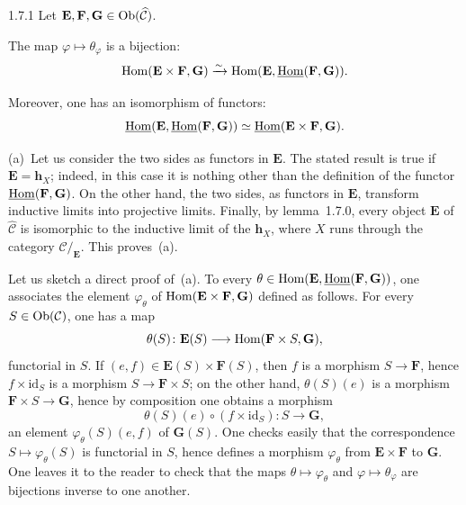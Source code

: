 \begin{proposition}{1.7.1}
\label{I.1.7.1}
\ndemark
Let \(\mathbf{E},\mathbf{F},\mathbf{G}\in\operatorname{Ob}(\widehat{\mathcal{C}})\).
\begin{enumeratea}
\item The map \(\varphi\mapsto\theta_{\varphi}\) is a bijection:
\[
\operatorname{Hom}(\mathbf{E}\times\mathbf{F},\mathbf{G})\xrightarrow{\sim}\operatorname{Hom}(\mathbf{E},\underline{\operatorname{Hom}}(\mathbf{F},\mathbf{G})).
\]
\item Moreover, one has an isomorphism of functors:
\[
\underline{\operatorname{Hom}}(\mathbf{E},\underline{\operatorname{Hom}}(\mathbf{F},\mathbf{G}))\simeq\underline{\operatorname{Hom}}(\mathbf{E}\times\mathbf{F},\mathbf{G}).
\]
\end{enumeratea}
\end{proposition}

(a)~Let us consider the two sides as functors in \(\mathbf{E}\). The stated result is true if \(\mathbf{E}=\mathbf{h}_X\); indeed, in this case it is nothing other than the definition of the functor \(\underline{\operatorname{Hom}}(\mathbf{F},\mathbf{G})\). On the other hand, the two sides, as functors in \(\mathbf{E}\), transform inductive limits into projective limits. Finally, by lemma~1.7.0, every object \(\mathbf{E}\) of \(\widehat{\mathcal{C}}\) is isomorphic to the inductive limit of the \(\mathbf{h}_X\), where \(X\) runs through the category \(\mathcal{C}/_{\mathbf{E}}\). This proves~(a).

Let us sketch a direct proof of~(a). To every \(\theta\in\operatorname{Hom}(\mathbf{E},\underline{\operatorname{Hom}}(\mathbf{F},\mathbf{G}))\), one associates the element \(\varphi_{\theta}\) of \(\operatorname{Hom}(\mathbf{E}\times\mathbf{F},\mathbf{G})\) defined as follows. For every \(S\in\operatorname{Ob}(\mathcal{C})\), one has a map
\[
\theta(S)\colon\mathbf{E}(S)\longrightarrow\operatorname{Hom}(\mathbf{F}\times S,\mathbf{G}),
\]
functorial in \(S\). If \((e,f)\in\mathbf{E}(S)\times\mathbf{F}(S)\), then \(f\) is a morphism \(S\to\mathbf{F}\), hence \(f\times\mathrm{id}_S\) is a morphism \(S\to\mathbf{F}\times S\); on the other hand, \(\theta(S)(e)\) is a morphism \(\mathbf{F}\times S\to\mathbf{G}\), hence by composition one obtains a morphism
\[
\theta(S)(e)\circ(f\times\mathrm{id}_S)\colon S\longrightarrow\mathbf{G},
\]
\ie an element \(\varphi_{\theta}(S)(e,f)\) of \(\mathbf{G}(S)\). One checks easily that the correspondence \(S\mapsto\varphi_{\theta}(S)\) is functorial in \(S\), hence defines a morphism \(\varphi_{\theta}\) from \(\mathbf{E}\times\mathbf{F}\) to \(\mathbf{G}\). One leaves it to the reader to check that the maps \(\theta\mapsto\varphi_{\theta}\) and \(\varphi\mapsto\theta_{\varphi}\) are bijections inverse to one another.

